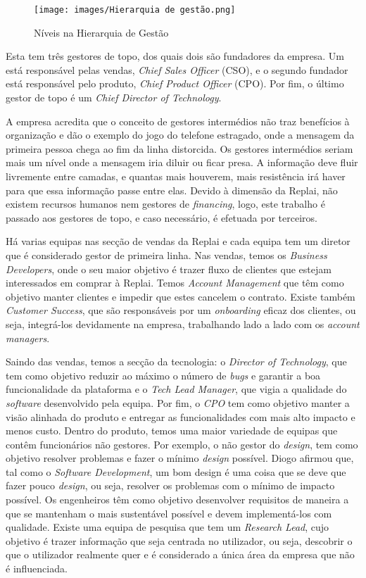     \begin{figure}[h]
        \centering
        \texttt{[image: images/Hierarquia de gestão.png]}
        \caption{Níveis na Hierarquia de Gestão}
        \label{fig:hierarquia_gestao}
    \end{figure}

    Esta tem três gestores de topo, dos quais dois são fundadores da empresa. Um está responsável pelas vendas, \textit{Chief Sales Officer} (CSO), e o segundo fundador está responsável pelo produto, \textit{Chief Product Officer} (CPO). Por fim, o último gestor de topo é um \textit{Chief Director of Technology}.

    A empresa acredita que o conceito de gestores intermédios não traz benefícios à organização e dão o exemplo do jogo do telefone estragado, onde a mensagem da primeira pessoa chega ao fim da linha distorcida. Os gestores intermédios seriam mais um nível onde a mensagem iria diluir ou ficar presa. A informação deve fluir livremente entre camadas, e quantas mais houverem, mais resistência irá haver para que essa informação passe entre elas. Devido à dimensão da Replai, não existem recursos humanos nem gestores de \textit{financing}, logo, este trabalho é passado aos gestores de topo, e caso necessário, é efetuada por terceiros.
    
    Há varias equipas nas secção de vendas da Replai e cada equipa tem um diretor que é considerado gestor de primeira linha. Nas vendas, temos os \textit{Business Developers}, onde o seu maior objetivo é trazer fluxo de clientes que estejam interessados em comprar à Replai. Temos \textit{Account Management} que têm como objetivo manter clientes e impedir que estes cancelem o contrato. Existe também \textit{Customer Success}, que são responsáveis por um \textit{onboarding} eficaz dos clientes, ou seja, integrá-los devidamente na empresa, trabalhando lado a lado com os \textit{account managers}.
    
    Saindo das vendas, temos a secção da tecnologia: o \textit{Director of Technology}, que tem como objetivo reduzir ao máximo o número de \textit{bugs} e garantir a boa funcionalidade da plataforma e o \textit{Tech Lead Manager}, que vigia a qualidade do \textit{software} desenvolvido pela equipa.
    Por fim, o \textit{CPO} tem como objetivo manter a visão alinhada do produto e entregar as funcionalidades com mais alto impacto e menos custo. Dentro do produto, temos uma maior variedade de equipas que contêm funcionários não gestores. Por exemplo, o não gestor do \textit{design}, tem como objetivo resolver problemas e fazer o mínimo \textit{design} possível. Diogo afirmou que, tal como o \textit{Software Development}, um bom design é uma coisa que se deve que fazer pouco \textit{design}, ou seja, resolver os problemas com o mínimo de impacto possível. Os engenheiros têm como objetivo desenvolver requisitos de maneira a que se mantenham o mais sustentável possível e devem implementá-los com qualidade. Existe uma equipa de pesquisa que tem um \textit{Research Lead}, cujo objetivo é trazer informação que seja centrada no utilizador, ou seja, descobrir o que o utilizador realmente quer e é considerado a única área da empresa que não é influenciada.
    
